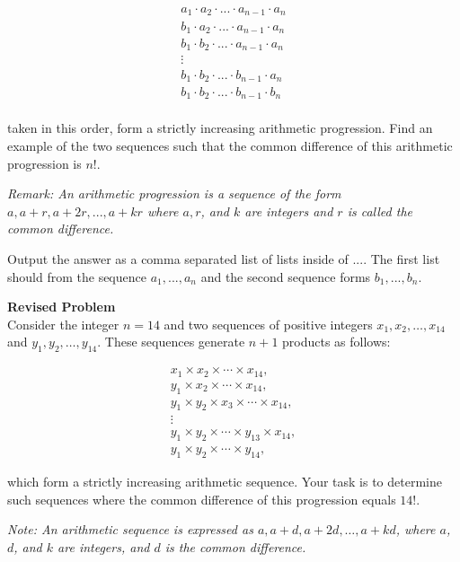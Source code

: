 \begin{align*}
    a_1 \cdot a_2 \cdot ... \cdot a_{n-1} \cdot a_{n} \\
    b_1 \cdot a_2 \cdot ... \cdot a_{n-1} \cdot a_{n} \\
    b_1 \cdot b_2 \cdot ... \cdot a_{n-1} \cdot a_{n} \\
    \vdots \\
    b_1 \cdot b_2 \cdot ... \cdot b_{n-1} \cdot a_{n} \\
    b_1 \cdot b_2 \cdot ... \cdot b_{n-1} \cdot b_{n} \\
\end{align*}

taken in this order, form a strictly increasing arithmetic progression. Find an example of the two sequences such that the common difference of this arithmetic progression is $n!$.

\textit{Remark: An arithmetic progression is a sequence of the form $a, a + r, a + 2r, ..., a + kr$ where $a, r$, and $k$ are integers and $r$ is called the common difference.}

Output the answer as a comma separated list of lists inside of $\boxed{...}$. The first list should from the sequence $a_1, ..., a_n$ and the second sequence forms $b_1, ..., b_n$.

\textbf{Revised Problem}\\
Consider the integer $n = 14$ and two sequences of positive integers $x_1, x_2, \ldots, x_{14}$ and $y_1, y_2, \ldots, y_{14}$. These sequences generate $n+1$ products as follows:

\[
\begin{align*}
    x_1 \times x_2 \times \cdots \times x_{14}, \\
    y_1 \times x_2 \times \cdots \times x_{14}, \\
    y_1 \times y_2 \times x_3 \times \cdots \times x_{14}, \\
    \vdots \\
    y_1 \times y_2 \times \cdots \times y_{13} \times x_{14}, \\
    y_1 \times y_2 \times \cdots \times y_{14},
\end{align*}
\]

which form a strictly increasing arithmetic sequence. Your task is to determine such sequences where the common difference of this progression equals $14!$.

\textit{Note: An arithmetic sequence is expressed as $a, a + d, a + 2d, \ldots, a + kd$, where $a$, $d$, and $k$ are integers, and $d$ is the common difference.}

